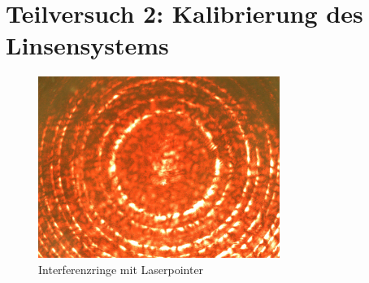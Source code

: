 \newpage
\section{Teilversuch 2: Kalibrierung des Linsensystems}
	\begin{figure}[!ht]
	    \centering
	    \includegraphics[width=0.7\textwidth]{images/Capture_807.bmp.jpg}
	    \caption{Interferenzringe mit Laserpointer}
	    \label{fig:laser-interference}
	\end{figure}